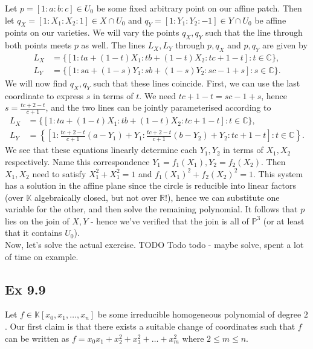 \documentclass{article}
\theoremstyle{definition}
\newcommand{\R}{\mathbb{R}}
\newcommand{\C}{\mathbb{C}}
\newcommand{\K}{\mathbb{K}}
\renewcommand{\P}{\mathbb{P}}
\newcommand{\PP}[1]{\P^{#1}}
\begin{document}
Let $p = [1:a:b:c] \in U_0$ be some fixed arbitrary point on our affine patch.
Then let $q_X = [1:X_1:X_2:1] \in X \cap U_0$ and $q_Y = [1:Y_1:Y_2:-1] \in Y
\cap U_0$ be affine points on our varieties. We will vary the points $q_X, q_Y$
such that the line through both points meets $p$ as well. The lines $L_X, L_Y$
through $p,q_X$ and $p, q_Y$ are given by 
\begin{align*}
	L_X
	&= 
	\{ [1 : ta + (1-t)X_1 : tb + (1-t)X_2 : tc + 1 - t] : t \in \C \}, \\
	L_Y
	&= 
	\{ [1 : sa + (1-s)Y_1 : sb + (1-s)Y_2 : sc - 1 + s] : s \in \C \}. 
\end{align*} 
We will now find $q_X, q_Y$ such that these lines coincide. First, we can use
the last coordinate to express $s$ in terms of $t$. We need $tc + 1 - t = sc -
1 + s$, hence $s = \frac{tc + 2 - t}{c + 1}$, and the two lines
can be jointly parameterised according to
\begin{align*}
	L_X
	&= 
	\{ [1 : ta + (1-t)X_1 : tb + (1-t)X_2 : tc + 1 - t] : t \in \C \}, \\
	L_Y
	&= 
	\left\{ \left[1 
		:
		\frac{tc + 2 - t}{c + 1}(a - Y_1) + Y_1 
		: 
		\frac{tc + 2 - t}{c + 1}(b - Y_2) + Y_2 
		: 
		tc + 1 - t
	\right] : t \in \C \right\}. 
\end{align*}
We see that these equations linearly determine each $Y_1, Y_2$ in terms of
$X_1, X_2$ respectively. Name this correspondence $Y_1 = f_1(X_1), Y_2 =
f_2(X_2)$. Then $X_1, X_2$ need to satisfy $X_1^{2} + X_1^{2} = 1$ and
$f_1(X_1)^2 + f_2(X_2)^2 = 1$. This system has a solution in the affine plane
since the circle is reducible into linear factors (over $\K$ algebraically
closed, but not over $\R$!), hence we can substitute one variable for the
other, and then solve the remaining polynomial. It follows that $p$ lies on the
join of $X, Y$ - hence we've verified that the join is all of $\PP{3}$ (or at
least that it contains $U_0$). \\

Now, let's solve the actual exercise. TODO Todo todo - maybe solve, spent a lot
of time on example.


\subsection*{Ex 9.9}

Let $f \in \K[x_0, x_1, \ldots, x_n]$ be some irreducible homogeneous
polynomial of degree $2$. Our first claim is that there exists a suitable
change of coordinates such that $f$ can be written as $f = x_0x_1 + x_2^2 +
x_3^2 + \ldots + x_m^2$ where $2 \leq m \leq n$. \\
\end{document}
